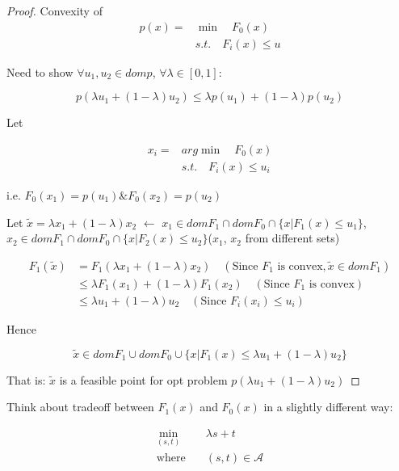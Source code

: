 \begin{proof}
	Convexity of
	\begin{align*}
	p(x) = &\min \quad F_0(x)\\
	&s.t. \quad F_i(x) \leq u
	\end{align*}
	
	Need to show $\forall u_1, u_2\in domp$, $\forall \lambda\in [0,1]$:
	
	\begin{equation*}
	p(\lambda u_1 + (1-\lambda)u_2) \leq \lambda  p(u_1) + (1-\lambda)p(u_2)
	\end{equation*}
	
	Let
	
	\begin{align*}
	x_i = &arg \min \quad F_0(x)\\
	&s.t. \quad F_i(x) \leq u_i
	\end{align*}
	
	i.e. $F_0(x_1) = p(u_1)\& F_0(x_2) =p(u_2)$
	
	Let $\tilde{x} = \lambda x_1 + (1-\lambda)x_2$ $\leftarrow$ $x_1\in domF_1\cap domF_0\cap \{x\vert F_1(x)\leq u_1 \}$, $x_2\in domF_1\cap domF_0\cap \{x\vert F_2(x)\leq u_2 \}$($x_1$, $x_2$ from different sets)
	
	\begin{align*}
	F_1(\tilde{x}) &= F_1(\lambda x_1 + (1-\lambda)x_2)\quad (\text{Since } F_1\text{ is convex}, \tilde{x}\in domF_1)\\
	&\leq \lambda F_1(x_1) + (1-\lambda)F_1(x_2)\quad (\text{Since } F_1 \text{ is convex})\\
	&\leq \lambda u_1 + (1-\lambda)u_2 \quad (\text{Since } F_i(x_i) \leq u_i)
	\end{align*}
	
	Hence 
	
	\begin{equation*}
	\tilde{x} \in domF_1 \cup domF_0 \cup \{x\vert F_1(x)\leq \lambda u_1 + (1-\lambda)u_2 \}
	\end{equation*}
	
	
	That is: $\tilde{x}$ is a feasible point for opt problem $p(\lambda u_1+(1-\lambda)u_2)$	
\end{proof}

Think about tradeoff between $F_1(x)$ and $F_0(x)$ in a slightly different way:


\begin{align*}
\min_{(s,t)} \quad&\lambda s + t\\
\text{where} \quad&(s,t) \in \mathcal{A}
\end{align*}

